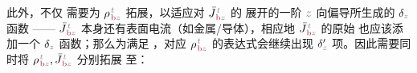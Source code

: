 此外，不仅  需要为 ${\rho}^{\;\!\mathcolor{gray}{t}}_{\;\!\textcolor{Maroon}{\text{b}}\mathcolor{gray}{z}}$ 拓展，以适应对 $\bar{J}^{\;\!\mathcolor{gray}{t}}_{\;\!\textcolor{Maroon}{\text{b}}\mathcolor{gray}{z}}$ 的  展开的一阶 $\mathcolor{gray}{z}$ 向偏导所生成的 $\delta_{\mathcolor{gray}{z}}$ 函数 —— $\bar{J}^{\;\!\mathcolor{gray}{t}}_{\;\!\textcolor{Maroon}{\text{b}}\mathcolor{gray}{z}}$ 本身还有表面电流（如金属/导体），相应地 $\bar{J}^{\;\!\mathcolor{gray}{t}}_{\;\!\textcolor{Maroon}{\text{b}}\mathcolor{gray}{z}}$ 的原始  也应该添加一个 $\delta_{\mathcolor{gray}{z}}$ 函数；那么为满足 ，对应 ${\rho}^{\;\!\mathcolor{gray}{t}}_{\;\!\textcolor{Maroon}{\text{b}}\mathcolor{gray}{z}}$ 的表达式会继续出现 $\delta'_{\mathcolor{gray}{z}}$ 项。因此需要同时将 ${\rho}^{\;\!\mathcolor{gray}{t}}_{\;\!\textcolor{Maroon}{\text{b}}\mathcolor{gray}{z}},\bar{J}^{\;\!\mathcolor{gray}{t}}_{\;\!\textcolor{Maroon}{\text{b}}\mathcolor{gray}{z}}$ 分别拓展  至：
